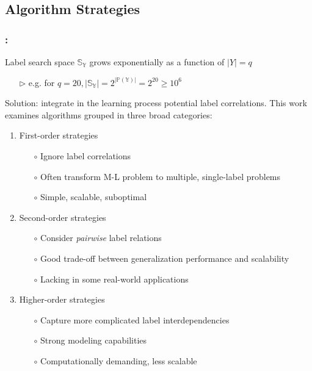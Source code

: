 \documentclass{beamer}
\begin{document}
\subsection{Algorithm Strategies}
\begin{frame}
\frametitle{\insertsection : \insertsubsection}
Label search space $\mathbb{S_Y}$ grows exponentially as a function of $|Y|=q$
\begin{itemize}
\item[$\triangleright$] e.g. for $q=20, |\mathbb{S_Y}| = 2 ^ {|\mathbb{P(Y)}|} = 2^{20} \ge 10^6$
\end{itemize}
Solution: integrate in the learning process potential label correlations.
This work examines algorithms grouped in three broad categories:

\begin{enumerate}
\item First-order strategies
\begin{itemize}
\item[$\circ$] Ignore label correlations
\item[$\circ$] Often transform M-L problem to multiple, single-label problems
\item[$\circ$] Simple, scalable, suboptimal
\end{itemize}
\item Second-order strategies
\begin{itemize}
\item[$\circ$] Consider \emph{pairwise} label relations
\item[$\circ$] Good trade-off between generalization performance and scalability
\item[$\circ$] Lacking in some real-world applications
\end{itemize}
\item Higher-order strategies
\begin{itemize}
\item[$\circ$] Capture more complicated label interdependencies
\item[$\circ$] Strong modeling capabilities
\item[$\circ$] Computationally demanding, less scalable
\end{itemize}

\end{enumerate}
\end{frame}

\end{document}
